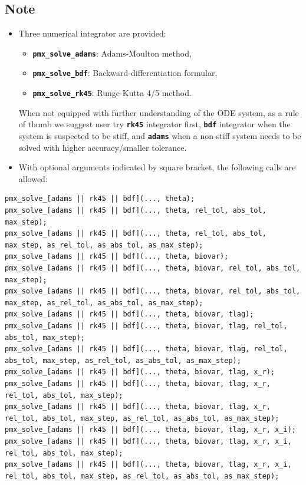 \documentclass[10pt, reqno, oneside]{amsbook}
\numberwithin{equation}{chapter}
\numberwithin{figure}{chapter}
\numberwithin{table}{chapter}
\theoremstyle{remark}
\begin{document}
\subsection{Note}
\label{sec:orgb6f5e0a}
\begin{itemize}
\item Three numerical integrator are provided:
\begin{itemize}
\item {\small \color{MRGGreen} \texttt{\textbf{pmx\_solve\_adams}}}: Adams-Moulton method,
\item {\small \color{MRGGreen} \texttt{\textbf{pmx\_solve\_bdf}}}: Backward-differentiation formular,
\item {\small \color{MRGGreen} \texttt{\textbf{pmx\_solve\_rk45}}}: Runge-Kutta 4/5 method.
\end{itemize}
When not equipped with further understanding of the ODE system, as a
rule of thumb we suggest user try
{\small \color{MRGGreen} \texttt{\textbf{rk45}}} integrator first, {\small \color{MRGGreen} \texttt{\textbf{bdf}}}
integrator when the system is suspected to be stiff, and
{\small \color{MRGGreen} \texttt{\textbf{adams}}} when a non-stiff system needs to be solved
with higher accuracy/smaller tolerance.
\item With optional arguments indicated by square bracket, the following calls are allowed:
\end{itemize}
\begin{verbatim}
pmx_solve_[adams || rk45 || bdf](..., theta);
pmx_solve_[adams || rk45 || bdf](..., theta, rel_tol, abs_tol, max_step);
pmx_solve_[adams || rk45 || bdf](..., theta, rel_tol, abs_tol, max_step, as_rel_tol, as_abs_tol, as_max_step);
pmx_solve_[adams || rk45 || bdf](..., theta, biovar);
pmx_solve_[adams || rk45 || bdf](..., theta, biovar, rel_tol, abs_tol, max_step);
pmx_solve_[adams || rk45 || bdf](..., theta, biovar, rel_tol, abs_tol, max_step, as_rel_tol, as_abs_tol, as_max_step);
pmx_solve_[adams || rk45 || bdf](..., theta, biovar, tlag);
pmx_solve_[adams || rk45 || bdf](..., theta, biovar, tlag, rel_tol, abs_tol, max_step);
pmx_solve_[adams || rk45 || bdf](..., theta, biovar, tlag, rel_tol, abs_tol, max_step, as_rel_tol, as_abs_tol, as_max_step);
pmx_solve_[adams || rk45 || bdf](..., theta, biovar, tlag, x_r);
pmx_solve_[adams || rk45 || bdf](..., theta, biovar, tlag, x_r, rel_tol, abs_tol, max_step);
pmx_solve_[adams || rk45 || bdf](..., theta, biovar, tlag, x_r, rel_tol, abs_tol, max_step, as_rel_tol, as_abs_tol, as_max_step);
pmx_solve_[adams || rk45 || bdf](..., theta, biovar, tlag, x_r, x_i);
pmx_solve_[adams || rk45 || bdf](..., theta, biovar, tlag, x_r, x_i, rel_tol, abs_tol, max_step);
pmx_solve_[adams || rk45 || bdf](..., theta, biovar, tlag, x_r, x_i, rel_tol, abs_tol, max_step, as_rel_tol, as_abs_tol, as_max_step);
\end{verbatim}
\end{document}

